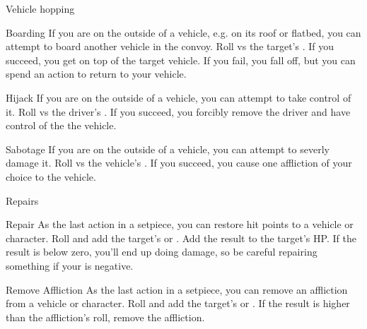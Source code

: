 \begin{abstractsection}{Vehicle hopping}
\vspace{1ex}
\begin{describe}{Boarding}
  If you are on the outside of a vehicle, e.g. on its roof or flatbed, you can attempt to board another vehicle in the convoy. Roll  vs the target's . If you succeed, you get on top of the target vehicle. If you fail, you fall off, but you can spend an action to return to your vehicle.
\end{describe}

\begin{describe}{Hijack}
  If you are on the outside of a vehicle, you can attempt to take control of it. Roll  vs the driver's . If you succeed, you forcibly remove the driver and have control of the the vehicle.
\end{describe}

\begin{describe}{Sabotage}
  If you are on the outside of a vehicle, you can attempt to severly damage it. Roll  vs the vehicle's . If you succeed, you cause one affliction of your choice to the vehicle.
\end{describe}
\end{abstractsection}

\begin{abstractsection}{Repairs}
\vspace{1ex}

\begin{describe}{Repair}
  As the last action in a setpiece, you can restore hit points to a vehicle or character. Roll  and add the target's  or . Add the result to the target's HP. If the result is below zero, you'll end up doing damage, so be careful repairing something if your  is negative.
\end{describe}

\begin{describe}{Remove Affliction}
  As the last action in a setpiece, you can remove an affliction from a vehicle or character. Roll  and add the target's  or . If the result is higher than the affliction's  roll, remove the affliction.
\end{describe}
\end{abstractsection}
